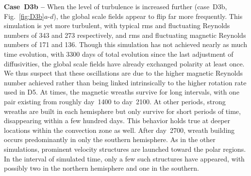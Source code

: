 \textbf{Case~D3b --} When the level of turbulence is increased further (case~D3b,
Fig.~\ref{fig:D3b}$a$-$d$), the global scale fields appear to flip far
more frequently.  This simulation is yet more turbulent, with typical
rms and fluctuating Reynolds numbers of 343 and 273 respectively, and
rms and fluctuating magnetic Reynolds numbers of 171 and 136.
Though this simulation has not achieved nearly as
much time evolution, with 3300 days of total evolution since the
last adjustment of diffusivities, the global scale fields have already
exchanged polarity at least once.  We thus suspect
that these oscillations are due to the higher magnetic Reynolds number
achieved rather than being linked intrinsically to the higher rotation
rate used in D5.  At times, the magnetic wreaths survive for long
intervals, with one pair existing from roughly day~1400 to day~2100.
At other periods, strong wreaths are built in each hemisphere but
only survive for short periods of time, disappearing within a few
hundred days.  This behavior holds true at deeper locations within the
convection zone as well.  After day~2700, wreath building occurs
predominantly in only the southern hemisphere.  As in the other
simulations, prominent velocity structures are launched toward the
polar regions.  In the interval of simulated time, only a few such
structures have appeared, with possibly two in the northern hemisphere
and one in the southern.

